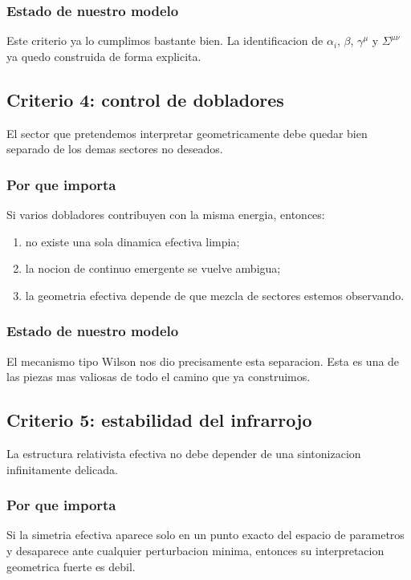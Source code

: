 \subsubsection*{Estado de nuestro modelo}
Este criterio ya lo cumplimos bastante bien. La identificacion de \(\alpha_i\), \(\beta\), \(\gamma^\mu\) y \(\Sigma^{\mu\nu}\) ya quedo construida de forma explicita.

\subsection{Criterio 4: control de dobladores}
El sector que pretendemos interpretar geometricamente debe quedar bien separado de los demas sectores no deseados.

\subsubsection*{Por que importa}
Si varios dobladores contribuyen con la misma energia, entonces:
\begin{enumerate}[label=\arabic*.]
    \item no existe una sola dinamica efectiva limpia;
    \item la nocion de continuo emergente se vuelve ambigua;
    \item la geometria efectiva depende de que mezcla de sectores estemos observando.
\end{enumerate}

\subsubsection*{Estado de nuestro modelo}
El mecanismo tipo Wilson nos dio precisamente esta separacion. Esta es una de las piezas mas valiosas de todo el camino que ya construimos.

\subsection{Criterio 5: estabilidad del infrarrojo}
La estructura relativista efectiva no debe depender de una sintonizacion infinitamente delicada.

\subsubsection*{Por que importa}
Si la simetria efectiva aparece solo en un punto exacto del espacio de parametros y desaparece ante cualquier perturbacion minima, entonces su interpretacion geometrica fuerte es debil.

